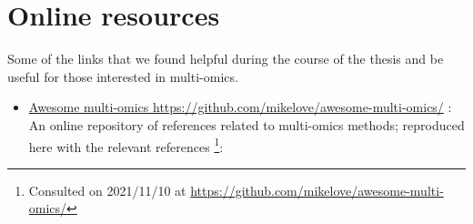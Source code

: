 \documentclass[
  12pt,
  a4paper,
  twoside,
  openright]{book}
\providecommand{\tightlist}{%
  \setlength{\itemsep}{0pt}\setlength{\parskip}{0pt}}
\newcounter{chapshift}
\begin{document}
\afterpage{\setcounter{chapshift}{0}}

\hypertarget{appendix-appendix}{%
\appendix {}}


\hypertarget{online-resources}{%
\chapter{Online resources}\label{online-resources}}

Some of the links that we found helpful during the course of the thesis and be useful for those interested in multi-omics.

\begin{itemize}
\tightlist
\item
  \href{https://github.com/mikelove/awesome-multi-omics/}{Awesome multi-omics https://github.com/mikelove/awesome-multi-omics/} : An online repository of references related to multi-omics methods; reproduced here with the relevant references \footnote{Consulted on 2021/11/10 at \url{https://github.com/mikelove/awesome-multi-omics/}}:
\end{itemize}
\end{document}
